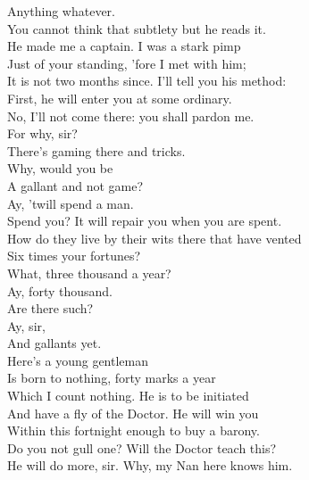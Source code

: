 \documentclass[a4paper,oneside,12pt]{memoir}
\begin{document}
\begin{drama*}
\facespeaks {} Anything whatever.\\
You cannot think that subtlety but he reads it.\\
He made me a captain. I was a stark pimp\\
Just of your standing, 'fore I met with him;\\
It is not two months since. I'll tell you his method:\\
First, he will enter you at some ordinary.\\
\kastrilspeaks No, I'll not come there: you shall pardon me.\\
\facespeaks {} For why, sir?\\
\kastrilspeaks There's gaming there and tricks.\\
\facespeaks {} Why, would you be\\
A gallant and not game?\\
\kastrilspeaks {} Ay, 'twill spend a man.\\
\facespeaks Spend you? It will repair you when you are spent.\\
How do they live by their wits there that have vented\\
Six times your fortunes?\\
\kastrilspeaks {} What, three thousand a year?\\
\facespeaks Ay, forty thousand.\\
\kastrilspeaks {} Are there such?\\
\facespeaks {} Ay, sir,\\
And gallants yet.\\
 Here's a young gentleman\\
Is born to nothing, forty marks a year\\
Which I count nothing. He is to be initiated\\
And have a fly of the Doctor. He will win you\\
Within this fortnight enough to buy a barony.\\
\kastrilspeaks Do you not gull one?  Will the Doctor teach this?\\
\facespeaks He will do more, sir. Why, my Nan here knows him.\\

\end{drama*}
\end{document}
